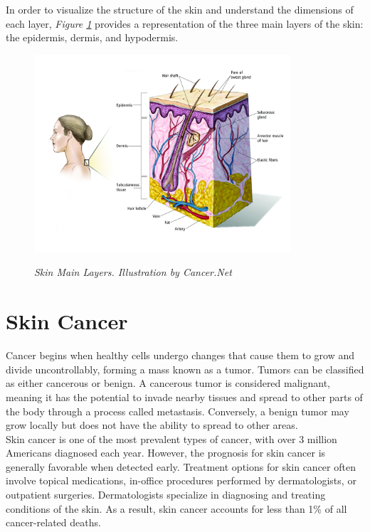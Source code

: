 In order to visualize the structure of the skin and understand the dimensions of each layer,
\textit{Figure \ref{fig:melanoma_diagram}} provides a representation of the three main layers of the skin:
the epidermis, dermis, and hypodermis.

\newpage

\begin{figure}[H]
\centering
\includegraphics[width=0.85\textwidth]{imatges/problem_domain/melanoma-diagram.jpg}
\caption[Skin Main Layers]{\textit{Skin Main Layers. Illustration by Cancer.Net}}
{\label{fig:melanoma_diagram}}
\end{figure}

\section{Skin Cancer}

Cancer begins when healthy cells undergo changes that cause them to grow and divide uncontrollably, forming a mass known as a tumor. Tumors can be classified as either cancerous or benign. A cancerous tumor is considered malignant, meaning it has the potential to invade nearby tissues and spread to other parts of the body through a process called metastasis. Conversely, a benign tumor may grow locally but does not have the ability to spread to other areas. \\

Skin cancer is one of the most prevalent types of cancer, with over 3 million Americans diagnosed each year. However, the prognosis for skin cancer is generally favorable when detected early. Treatment options for skin cancer often involve topical medications, in-office procedures performed by dermatologists, or outpatient surgeries. Dermatologists specialize in diagnosing and treating conditions of the skin. As a result, skin cancer accounts for less than 1\% of all cancer-related deaths. \\


